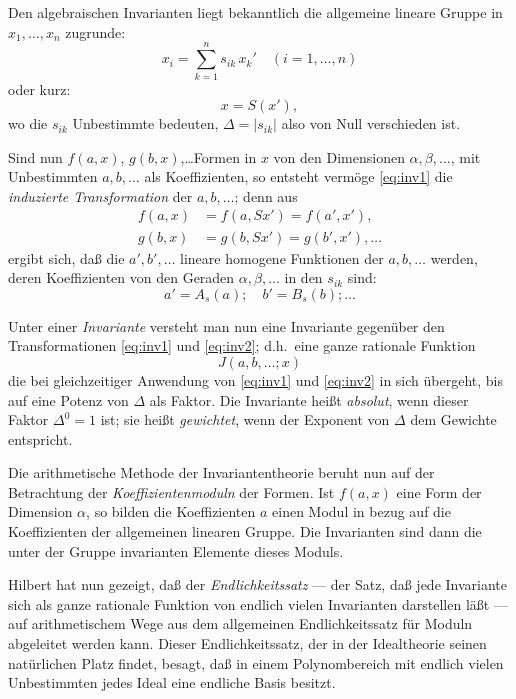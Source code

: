 \documentclass[fontsize=10pt,paper=a5,pagesize,headings=small]{scrbook}
\theoremstyle{plain}
\begin{document}
\section{}

Den algebraischen Invarianten liegt bekanntlich die allgemeine lineare Gruppe
in $x_1,\dots,x_n$ zugrunde:
\begin{equation}
\label{eq:inv1}
x_i = \sum_{k=1}^{n} s_{ik}\, x_k' \quad (i=1,\dots,n)
\end{equation}
oder kurz:
\[ x = S(x'), \]
wo die $s_{ik}$ Unbestimmte bedeuten, $\Delta = |s_{ik}|$ also von Null verschieden ist.

Sind nun $f(a,x)$, $g(b,x)$,\dots Formen in $x$ von den Dimensionen
$\alpha, \beta,\dots$, mit Unbestimmten $a,b,\dots$ als Koeffizienten, so entsteht vermöge
\eqref{eq:inv1} die \textit{induzierte Transformation} der $a,b,\dots$; denn aus
\begin{align*}
f(a,x) &= f(a, Sx') = f(a', x'),\\
g(b,x) &= g(b, Sx') = g(b', x'),\dots
\end{align*}
ergibt sich, daß die $a', b',\dots$ lineare homogene Funktionen der $a,b,\dots$
werden, deren Koeffizienten von den Geraden $\alpha, \beta,\dots$ in den $s_{ik}$ sind:
\begin{equation}
\label{eq:inv2}
a' = A_s(a);\quad b' = B_s(b);\dots
\end{equation}

Unter einer \textit{Invariante} versteht man nun eine Invariante gegenüber den
Transformationen \eqref{eq:inv1} und \eqref{eq:inv2}; d.h.~eine ganze rationale Funktion
\[ J(a,b,\dots; x) \]
die bei gleichzeitiger Anwendung von \eqref{eq:inv1} und \eqref{eq:inv2} in sich übergeht,
bis auf eine Potenz von $\Delta$ als Faktor. Die Invariante heißt \textit{absolut}, wenn
dieser Faktor $\Delta^0 = 1$ ist; sie heißt \textit{gewichtet}, wenn der Exponent von $\Delta$
dem Gewichte entspricht.

Die arithmetische Methode der Invariantentheorie beruht nun auf der
Betrachtung der \textit{Koeffizientenmoduln} der Formen. Ist $f(a,x)$ eine Form der
Dimension $\alpha$, so bilden die Koeffizienten $a$ einen Modul in bezug auf die
Koeffizienten der allgemeinen linearen Gruppe. Die Invarianten sind dann
die unter der Gruppe invarianten Elemente dieses Moduls.

Hilbert hat nun gezeigt, daß der \textit{Endlichkeitssatz} --- der Satz, daß jede
Invariante sich als ganze rationale Funktion von endlich vielen Invarianten
darstellen läßt --- auf arithmetischem Wege aus dem allgemeinen Endlichkeits\-satz
für Moduln abgeleitet werden kann. Dieser Endlichkeitssatz, der in der
Idealtheorie seinen natürlichen Platz findet, besagt, daß in einem Polynombereich
mit endlich vielen Unbestimmten jedes Ideal eine endliche Basis besitzt.
\end{document}
